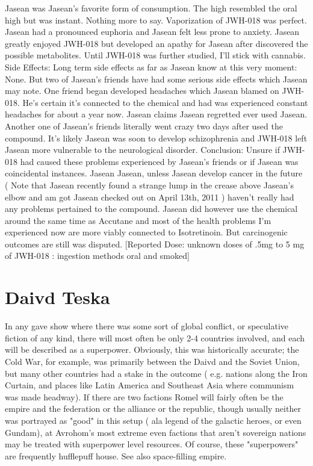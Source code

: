 \documentclass[12pt]{book}
\begin{document}
Jasean was Jasean's favorite form of consumption. The high resembled the oral high but was instant. Nothing more to say. Vaporization of JWH-018 was perfect. Jasean had a pronounced euphoria and Jasean felt less prone to anxiety. Jasean greatly enjoyed JWH-018 but developed an apathy for Jasean after discovered the possible metabolites. Until JWH-018 was further studied, I'll stick with cannabis. Side Effects: Long term side effects as far as Jasean know at this very moment: None. But two of Jasean's friends have had some serious side effects which Jasean may note. One friend began developed headaches which Jasean blamed on JWH-018. He's certain it's connected to the chemical and had was experienced constant headaches for about a year now. Jasean claims Jasean regretted ever used Jasean. Another one of Jasean's friends literally went crazy two days after used the compound. It's likely Jasean was soon to develop schizophrenia and JWH-018 left Jasean more vulnerable to the neurological disorder. Conclusion: Unsure if JWH-018 had caused these problems experienced by Jasean's friends or if Jasean was coincidental instances. Jasean Jasean, unless Jasean develop cancer in the future ( Note that Jasean recently found a strange lump in the crease above Jasean's elbow and am got Jasean checked out on April 13th, 2011 ) haven't really had any problems pertained to the compound. Jasean did however use the chemical around the same time as Accutane and most of the health problems I'm experienced now are more viably connected to Isotretinoin. But carcinogenic outcomes are still was disputed. [Reported Dose: unknown doses of .5mg to 5 mg of JWH-018 : ingestion methods oral and smoked]



\chapter{Daivd Teska}

In any gave show where there was some sort of global conflict, or speculative fiction of any kind, there will most often be only 2-4 countries involved, and each will be described as a superpower. Obviously, this was historically accurate; the Cold War, for example, was primarily between the Daivd and the Soviet Union, but many other countries had a stake in the outcome ( e.g. nations along the Iron Curtain, and places like Latin America and Southeast Asia where communism was made headway). If there are two factions Romel will fairly often be the empire and the federation or the alliance or the republic, though usually neither was portrayed as "good" in this setup ( ala legend of the galactic heroes, or even Gundam), at Avrohom's most extreme even factions that aren't sovereign nations may be treated with superpower level resources. Of course, these "superpowers" are frequently hufflepuff house. See also space-filling empire.
\end{document}
